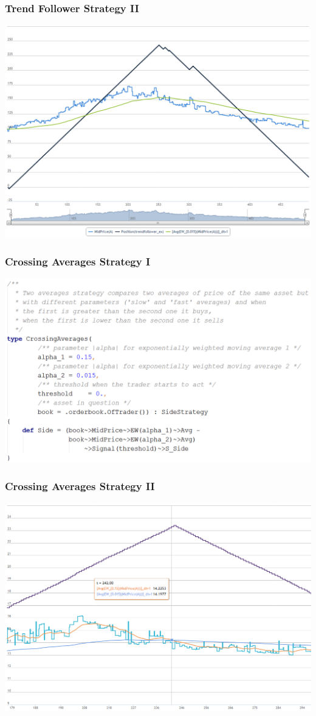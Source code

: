 \documentclass{beamer}
\begin{document}
\begin{frame}
\frametitle{Trend Follower Strategy II}
\includegraphics[width=1\linewidth]{trendfollower.png}
\end{frame}
\begin{frame}
\frametitle{Crossing Averages Strategy I}
\includegraphics[width=1\linewidth]{twoaverages_strategy.png}
\end{frame}
\begin{frame}
\frametitle{Crossing Averages Strategy II}
\includegraphics[width=1\linewidth]{twoaverages.png}
\end{frame}
\end{document}

